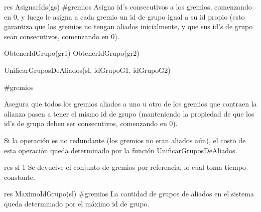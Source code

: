 {
	\state res \asig AsignarIds(gs)								
}
{\#gremios}
{Asigna id's consecutivos a los gremios, comenzando en 0, y luego le asigna a cada gremio un id de grupo igual a su id propio (esto garantiza que los gremios no tengan aliados inicialmente, y que sus id's de grupo sean consecutivos, comenzando en 0). }

{
	\state {} \asig ObtenerIdGrupo(gr1)						
	\state {} \asig ObtenerIdGrupo(gr2)						
	\state 

													
		\state UnificarGruposDeAliados(sl, idGrupoG1, idGrupoG2)					
	\endif
}
{\#gremios}
{ Asegura que todos los gremios aliados a uno u otro de los gremios que contraen la alianza pasen a tener el mismo id de grupo (manteniendo la propiedad de que los id's de grupo deben ser consecutivos, comenzando en 0).

\hspace{10pt} Si la operaci\'on es no redundante (los gremios no eran aliados a\'un), el costo de esta operaci\'on queda determinado por la funci\'on UnificarGruposDeAliados. }

{
	\state res \asig sl								
}
{1}
{ Se devuelve el conjunto de gremios por referencia, lo cual toma tiempo constante. }

{
	\state res \asig MaximoIdGrupo(sl)						
}
{\#gremios}
{La cantidad de grupos de aliados en el sistema queda determinado por el m\'aximo id de grupo.}

